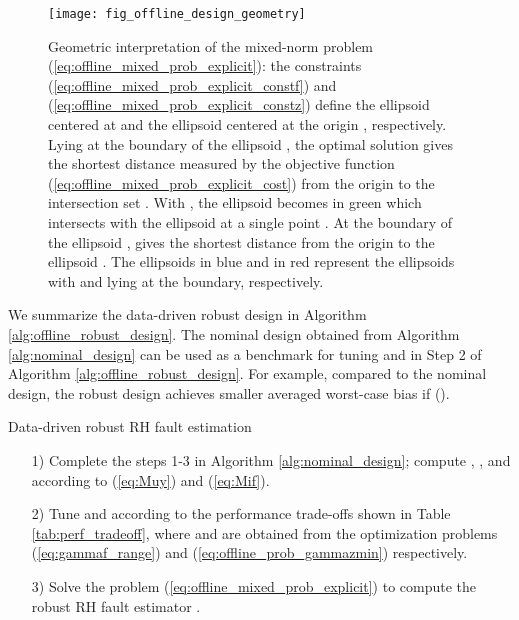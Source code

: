\documentclass[twocolumn]{autart}
\begin{document}
\begin{figure}[!ht]
\begin{center}
\texttt{[image: fig\_offline\_design\_geometry]}
\caption{Geometric interpretation of the mixed-norm problem (\ref{eq:offline_mixed_prob_explicit}): the constraints (\ref{eq:offline_mixed_prob_explicit_constf}) and (\ref{eq:offline_mixed_prob_explicit_constz}) define the ellipsoid  centered at  and the ellipsoid  centered at the origin , respectively.
Lying at the boundary of the ellipsoid , the optimal solution
 gives the shortest distance measured by the objective function (\ref{eq:offline_mixed_prob_explicit_cost}) from the origin to the intersection set .
With , the ellipsoid  becomes  in green which intersects with the ellipsoid  at a single point .
At the boundary of the ellipsoid ,
 gives the shortest distance from the origin to the ellipsoid .
The ellipsoids  in blue and  in red represent the ellipsoids  with  and  lying at the boundary, respectively.}
\label{fig:geom}
\end{center}
\end{figure}




We summarize the data-driven robust design in Algorithm \ref{alg:offline_robust_design}. The nominal design  obtained from Algorithm \ref{alg:nominal_design} can be used as a benchmark for tuning  and  in Step 2 of Algorithm \ref{alg:offline_robust_design}. For example, compared to the nominal design, the robust design achieves smaller averaged worst-case bias if  ().



\begin{algorithm}
  \caption{Data-driven robust RH fault estimation}
  \label{alg:offline_robust_design}
  \begin{algorithmic}
    \State
    \begin{enumerate}
      \item[1)] Complete the steps 1-3 in Algorithm \ref{alg:nominal_design}; compute , , and  according to (\ref{eq:Muy}) and (\ref{eq:Mif}).
      \item[2)] Tune  and  according to the performance trade-offs shown in Table \ref{tab:perf_tradeoff}, where  and  are obtained from the optimization problems (\ref{eq:gammaf_range}) and (\ref{eq:offline_prob_gammazmin}) respectively.
      \item[3)] Solve the problem (\ref{eq:offline_mixed_prob_explicit}) to compute the robust RH fault estimator .
    \end{enumerate}
  \end{algorithmic}
\end{algorithm}
\end{document}
